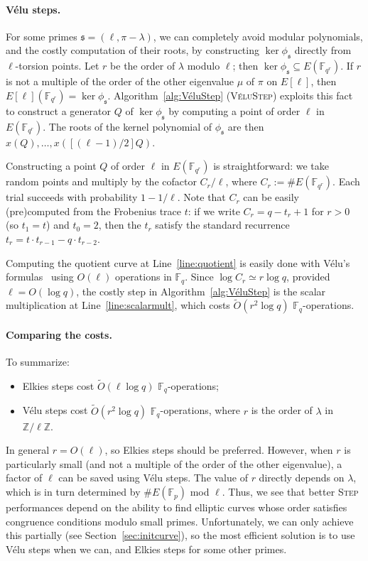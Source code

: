 \documentclass{llncs}
\newcommand{\F}{\mathbb{F}}
\newcommand{\Z}{\mathbb{Z}}
\newcommand{\softO}{\tilde{O}}
\newcommand{\algstyle}[1]{\textsc{#1}}
\renewcommand{\frak}{\mathfrak}
\begin{document}
\paragraph{Vélu steps.}

For some primes $\frak{s} = (\ell,\pi-\lambda)$,
we can completely avoid modular polynomials,
and the costly computation of their roots,
by constructing $\ker\phi_{\frak{s}}$ directly from $\ell$-torsion points.
Let $r$ be the order of $\lambda$ modulo $\ell$;
then $\ker\phi_{\frak s} \subseteq E(\F_{q^r})$.
If $r$ is not a multiple of the order of the other eigenvalue $\mu$
of $\pi$ on $E[\ell]$,
then $E[\ell](\F_{q^r}) = \ker\phi_{\frak s}$.
Algorithm~\ref{alg:VéluStep} (\algstyle{VéluStep}) 
exploits this fact to construct a generator $Q$ of $\ker\phi_{\frak s}$
by computing a point of order $\ell$ in $E(\F_{q^r})$.
The roots of the kernel polynomial of $\phi_{\frak s}$
are then $x(Q), \ldots, x([(\ell-1)/2]Q)$.

Constructing a point $Q$ of order $\ell$ in $E(\F_{q^r})$
is straightforward:
we take random points and multiply by the cofactor $C_r/\ell$,
where $C_r := \#E(\F_{q^r})$.
Each trial succeeds with probability $1 - 1/\ell$.
Note that $C_r$ can be easily (pre)computed from the Frobenius trace $t$:
if we write $C_r = q - t_r + 1$ for 
$r > 0$ (so $t_1 = t$) and $t_0 = 2$,
then the $t_r$ satisfy the standard recurrence
$t_r = t\cdot t_{r-1} - q\cdot t_{r-2}$. 

Computing the quotient curve at Line~\ref{line:quotient} is easily done
with Vélu's formulas~\cite{Velu71} using $O(\ell)$ operations in $\F_q$.
Since $\log C_r\simeq r\log q$, provided $\ell = O(\log q)$,
the costly step in Algorithm~\ref{alg:VéluStep} is the scalar
multiplication at Line~\ref{line:scalarmult}, which costs
$\softO(r^2\log q)$ $\F_q$-operations.

\paragraph{Comparing the costs.}
To summarize:
\begin{itemize}
\item Elkies steps cost $\softO(\ell\log q)$ $\F_q$-operations;
\item Vélu steps cost $\softO(r^2\log q)$ $\F_q$-operations,
    where $r$ is the order of $\lambda$ in $\Z/\ell\Z$.
\end{itemize}
In general $r = O(\ell)$, so Elkies steps should be preferred. 
However, when $r$ is particularly small
(and not a multiple of the order of the other eigenvalue),
a factor of $\ell$ can be saved using Vélu steps.
The value of $r$ directly depends on $\lambda$, which is in turn determined by
$\#E(\F_p)$ mod $\ell$. Thus, we see that better \algstyle{Step} performances
depend on the ability to find elliptic curves whose order
satisfies congruence conditions modulo small primes.
Unfortunately, we can only achieve this partially
(see Section~\ref{sec:initcurve}), so the most efficient solution is
to use Vélu steps when we can, and Elkies steps for some other primes.
\end{document}

